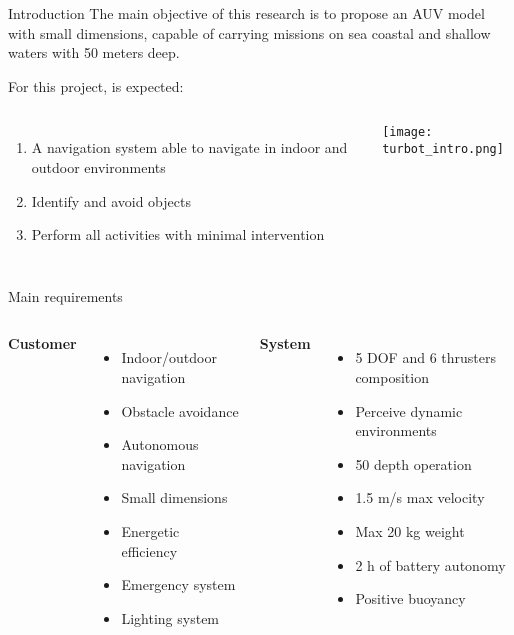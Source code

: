 \begin{frame}[t]{Introduction}    
  \transdissolve[duration=0.5]
  The main objective of this research is to propose an AUV model with small dimensions, capable of carrying missions on sea coastal and shallow waters with 50 meters deep. 

  For this project, is expected: 
  \newline
  \begin{columns}[c]
      \begin{enumerate}
        \item A navigation system able to navigate in indoor and outdoor environments
        \item Identify and avoid objects
        \item Perform all activities with minimal intervention
      \end{enumerate}
      \texttt{[image: turbot\_intro.png]}
  \end{columns}

\end{frame}
\begin{frame}[t]{Main requirements}
  \transdissolve[duration=0.5]
  \begin{columns}[c]
      \textbf{Customer}
      \begin{itemize}
        \item Indoor/outdoor navigation
        \item Obstacle avoidance
        \item Autonomous navigation
        \item Small dimensions
        \item Energetic efficiency
        \item Emergency system
        \item Lighting system
      \end{itemize}
      \textbf{System}
      \begin{itemize}
        \item 5 DOF and 6 thrusters composition
        \item Perceive dynamic environments
        \item 50 depth operation
        \item 1.5 m/s max velocity
        \item Max 20 kg weight
        \item 2 h of battery autonomy
        \item Positive buoyancy
      \end{itemize}
  \end{columns}
\end{frame}

